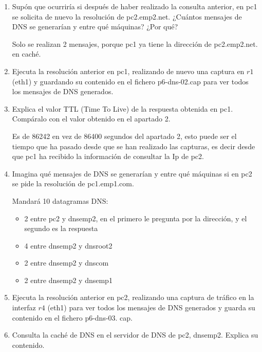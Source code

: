 \documentclass[12pt, a4paper]{report}
\begin{document}
\begin{enumerate}
  \item Supón que ocurriría si después de haber realizado la consulta anterior, en pc1 se solicita de nuevo la resolución de pc2.emp2.net. ¿Cuántos mensajes de DNS se generarían y entre qué máquinas? ¿Por qué?
  
  Solo se realizan 2 mensajes, porque pc1 ya tiene la dirección de pc2.emp2.net. en caché.

  \item Ejecuta la resolución anterior en pc1, realizando de nuevo una captura en $r 1$ (eth1) y guardando su contenido en el fichero p6-dns-02.cap para ver todos los mensajes de DNS generados.

  \item Explica el valor TTL (Time To Live) de la respuesta obtenida en pc1. Compáralo con el valor obtenido en el apartado 2.
  
  Es de 86242 en vez de 86400 segundos del apartado 2, esto puede ser el tiempo que ha pasado desde que se han realizado las capturas, es decir desde que pc1 ha recibido la información de consultar la Ip de pc2.

  \item Imagina qué mensajes de DNS se generarían y entre qué máquinas si en pc2 se pide la resolución de pc1.emp1.com.
  
  Mandará 10 datagramas DNS:
	\begin{itemize}
		\item 2 entre pc2 y dnsemp2, en el primero le pregunta por la dirección, y el segundo es la respuesta
		\item 4 entre dnsemp2 y dnsroot2
		\item 2 entre dnsemp2 y dnscom
		\item 2 entre dnsemp2 y dnsemp1
	\end{itemize}
  \item Ejecuta la resolución anterior en pc2, realizando una captura de tráfico en la interfaz $r 4$ (eth1) para ver todos los mensajes de DNS generados y guarda su contenido en el fichero p6-dns-03. cap.

  \item Consulta la caché de DNS en el servidor de DNS de pc2, dnsemp2. Explica su contenido.
  

\end{enumerate}
\end{document}

